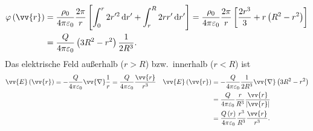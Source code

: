 \documentclass[a4paper,12pt]{article}
\newcommand{\td}{\,\text{d}}
\numberwithin{equation}{section}
\begin{document}
\begin{align} 
        \varphi \left(\vv{r}\right)&=\dfrac{\rho _0}{4\pi \varepsilon _0}\dfrac{2\pi }{r}\left[\int_{0}^{r}2r'^2\td r'+\int_{r}^{R}2rr'\td r'\right]=\dfrac{\rho _0}{4\pi \varepsilon _0}\dfrac{2\pi }{r}\left[\dfrac{2r^3}{3}+r\left(R^2-r^2\right)\right]\\
                                   &=\dfrac{Q}{4\pi \varepsilon _0}\left(3R^2-r^2\right)\dfrac{1}{2R^3}
.\end{align} 
Das elektrische Feld außerhalb ($r>R$) bzw.\ innerhalb ($r<R$) ist
\begin{align} 
        \vv{E}\left(\vv{r}\right)&=-\dfrac{Q}{4\pi \varepsilon _0}\vv{\nabla }\dfrac{1}{r}=\dfrac{Q}{4\pi \varepsilon _0}\dfrac{\vv{r}}{r^3}& \vv{E}\left(\vv{r}\right)&=-\dfrac{Q}{4\pi \varepsilon _0}\dfrac{1}{2R^3}\vv{\nabla }\left(3R^2-r^2\right)\\
                                 &&&=\dfrac{Q}{4\pi \varepsilon _0}\dfrac{r}{R^3}\dfrac{\vv{r}}{|\vv{r}|}\nonumber \\
                                 &&&=\dfrac{Q\left(r\right)}{4\pi \varepsilon _0}\dfrac{r^3}{R^3}\dfrac{\vv{r}}{r^3}
.\end{align} 
\end{document}
